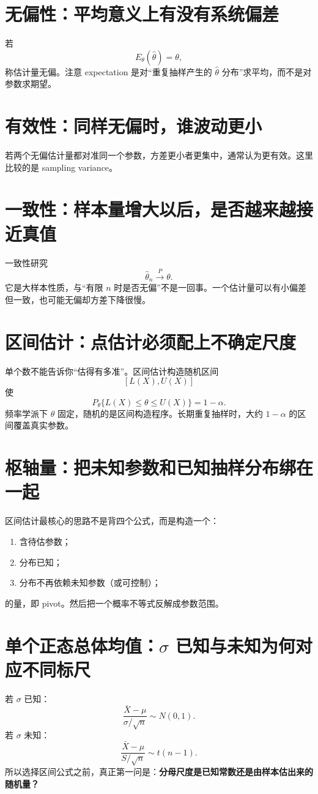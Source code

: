 \documentclass[11pt,a4paper,openany]{ctexbook}
\newcommand{\key}[1]{\textbf{\color{deep}#1}}
\begin{document}
\section{无偏性：平均意义上有没有系统偏差}
若
\[
E_\theta(\hat\theta)=\theta,
\]
称估计量无偏。注意 expectation 是对“重复抽样产生的 $\hat\theta$ 分布”求平均，而不是对参数求期望。

\section{有效性：同样无偏时，谁波动更小}
若两个无偏估计量都对准同一个参数，方差更小者更集中，通常认为更有效。这里比较的是 sampling variance。

\section{一致性：样本量增大以后，是否越来越接近真值}
一致性研究
\[
\hat\theta_n\xrightarrow{P}\theta.
\]
它是大样本性质，与“有限 $n$ 时是否无偏”不是一回事。一个估计量可以有小偏差但一致，也可能无偏却方差下降很慢。

\section{区间估计：点估计必须配上不确定尺度}
单个数不能告诉你“估得有多准”。区间估计构造随机区间
\[
[L(X),U(X)]
\]
使
\[
P_\theta\{L(X)\le\theta\le U(X)\}=1-\alpha.
\]
频率学派下 $\theta$ 固定，随机的是区间构造程序。长期重复抽样时，大约 $1-\alpha$ 的区间覆盖真实参数。

\section{枢轴量：把未知参数和已知抽样分布绑在一起}
区间估计最核心的思路不是背四个公式，而是构造一个：
\begin{enumerate}
  \item 含待估参数；
  \item 分布已知；
  \item 分布不再依赖未知参数（或可控制）；
\end{enumerate}
的量，即 pivot。然后把一个概率不等式反解成参数范围。

\section{单个正态总体均值：$\sigma$ 已知与未知为何对应不同标尺}
若 $\sigma$ 已知：
\[
\frac{\bar X-\mu}{\sigma/\sqrt n}\sim N(0,1).
\]
若 $\sigma$ 未知：
\[
\frac{\bar X-\mu}{S/\sqrt n}\sim t(n-1).
\]
所以选择区间公式之前，真正第一问是：\key{分母尺度是已知常数还是由样本估出来的随机量？}
\end{document}
